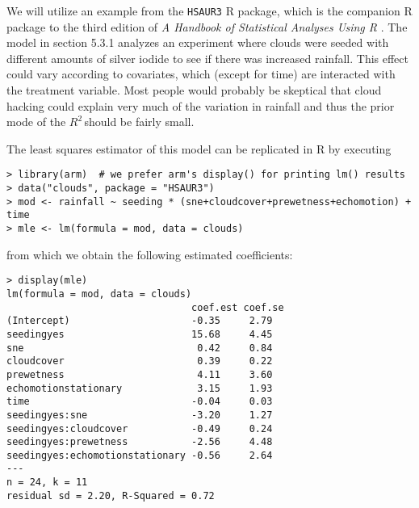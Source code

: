 \documentclass[11pt]{article}
\newcommand{\Rsq}{$R^2\,$}
\begin{document}
We will utilize an example from the {\tt HSAUR3} R package, which is the
companion R package to the third edition of \emph{A Handbook of Statistical
Analyses Using R} \cite{HSAUR3-book}. The model in section 5.3.1 analyzes an
experiment where clouds were seeded with different amounts of silver iodide to
see if there was increased rainfall. This effect could vary according to
covariates, which (except for time) are interacted with the treatment variable.
Most people would probably be skeptical that cloud hacking could explain very
much of the variation in rainfall and thus the prior mode of the \Rsq should be
fairly small.

The least squares estimator of this model can be replicated in R by executing

\vspace{.5cm}
\begin{lstlisting}[frame=lines]
> library(arm)  # we prefer arm's display() for printing lm() results
> data("clouds", package = "HSAUR3")
> mod <- rainfall ~ seeding * (sne+cloudcover+prewetness+echomotion) + time
> mle <- lm(formula = mod, data = clouds)
\end{lstlisting}
\vspace{.5cm}

\noindent from which we obtain the following estimated coefficients:

\vspace{.5cm}
\begin{lstlisting}[frame=lines]
> display(mle)
lm(formula = mod, data = clouds)
                                coef.est coef.se
(Intercept)                     -0.35     2.79
seedingyes                      15.68     4.45
sne                              0.42     0.84
cloudcover                       0.39     0.22
prewetness                       4.11     3.60
echomotionstationary             3.15     1.93
time                            -0.04     0.03
seedingyes:sne                  -3.20     1.27
seedingyes:cloudcover           -0.49     0.24
seedingyes:prewetness           -2.56     4.48
seedingyes:echomotionstationary -0.56     2.64
---
n = 24, k = 11
residual sd = 2.20, R-Squared = 0.72
\end{lstlisting}
\vspace{.5cm}
\end{document}
